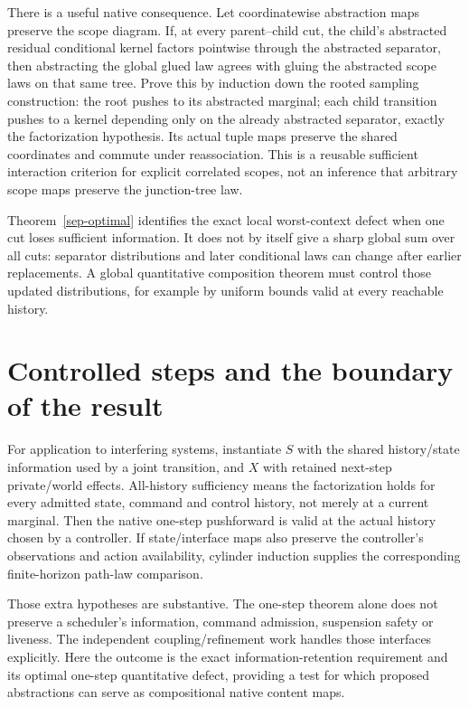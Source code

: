 \documentclass[11pt]{article}
\begin{document}
There is a useful native consequence. Let coordinatewise abstraction maps preserve the scope diagram. If, at every parent--child cut, the child's abstracted residual conditional kernel factors pointwise through the abstracted separator, then abstracting the global glued law agrees with gluing the abstracted scope laws on that same tree. Prove this by induction down the rooted sampling construction: the root pushes to its abstracted marginal; each child transition pushes to a kernel depending only on the already abstracted separator, exactly the factorization hypothesis. Its actual tuple maps preserve the shared coordinates and commute under reassociation. This is a reusable sufficient interaction criterion for explicit correlated scopes, not an inference that arbitrary scope maps preserve the junction-tree law.

Theorem~\ref{sep-optimal} identifies the exact local worst-context defect when one cut loses sufficient information. It does not by itself give a sharp global sum over all cuts: separator distributions and later conditional laws can change after earlier replacements. A global quantitative composition theorem must control those updated distributions, for example by uniform bounds valid at every reachable history.

\section{Controlled steps and the boundary of the result}
For application to interfering systems, instantiate $S$ with the shared history/state information used by a joint transition, and $X$ with retained next-step private/world effects. All-history sufficiency means the factorization holds for every admitted state, command and control history, not merely at a current marginal. Then the native one-step pushforward is valid at the actual history chosen by a controller. If state/interface maps also preserve the controller's observations and action availability, cylinder induction supplies the corresponding finite-horizon path-law comparison.

Those extra hypotheses are substantive. The one-step theorem alone does not preserve a scheduler's information, command admission, suspension safety or liveness. The independent coupling/refinement work handles those interfaces explicitly. Here the outcome is the exact information-retention requirement and its optimal one-step quantitative defect, providing a test for which proposed abstractions can serve as compositional native content maps.
\end{document}
